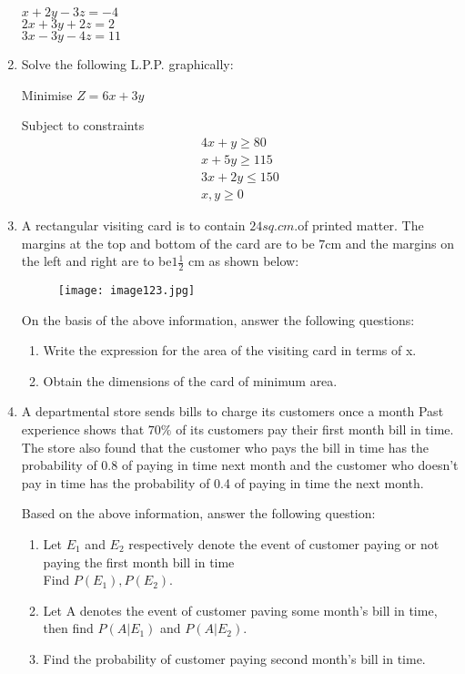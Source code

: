 \documentclass{article}
\begin{document}
\begin{enumerate}
$x +2y-3z=-4$\\
$2x+3y+2z=2$\\
$3x-3y-4z=11$

\item Solve the following L.P.P. graphically:

Minimise $Z = 6x + 3y$

Subject to constraints
\begin{align*}
 4x+y\geq80\\
 x+5y\geq115\\
 3x+2y\leq150\\
x,y\geq0
\end{align*}
\item A rectangular visiting card is to contain $24 sq.cm. $of printed matter. The margins at the top and bottom of the card are to be $7\mathrm{cm}$ and the margins on the left and right are to be$1\frac{1}{2}$ cm as shown below:
\newpage
\begin{figure}[h!]
\centering
\texttt{[image: image123.jpg]}
\caption{}
\label{fig:image123}
\end{figure}

On the basis of the above information, answer the following questions:
\begin{enumerate}
\item Write the expression for the area of the visiting card in terms of x.
\item Obtain the dimensions of the card of minimum area.
\end{enumerate}
\item A departmental store sends bills to charge its customers once a month Past experience shows that $ 70\% $ of its customers pay their first month bill in time. The store also found that the customer who pays the bill in time has the probability of 0.8 of paying in time next month and the customer who doesn't pay in time has the probability of 0.4 of paying in time the next month.

Based on the above information, answer the following question:
\begin{enumerate}
\item Let  $E_1$ and $E_2$ respectively denote the event of customer paying or not paying the first month bill in time\\
Find $P(E_1),P(E_2).$
\item Let A denotes the event of customer paving some month's bill in time, then find $P(A|E_1)$ and $P(A|E_2).$
\item Find the probability of customer paying second month's bill in time.
\end{enumerate}


\end{enumerate}
\end{document}
